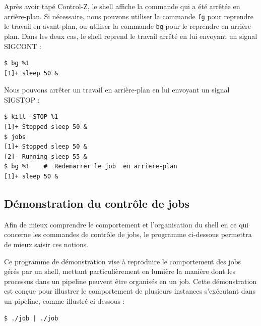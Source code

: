 Après avoir tapé Control-Z, le shell affiche la commande qui a été arrêtée en arrière-plan. Si nécessaire, nous pouvons utiliser la commande \texttt{fg} pour reprendre le travail en avant-plan, ou utiliser la commande \texttt{bg} pour le reprendre en arrière-plan. Dans les deux cas, le shell reprend le travail arrêté en lui envoyant un signal SIGCONT :
\begin{lstlisting}[style=blackstyle]
$ bg %1
[1]+ sleep 50 &  
\end{lstlisting}

Nous pouvons arrêter un travail en arrière-plan en lui envoyant un signal SIGSTOP :

\begin{lstlisting}[style=blackstyle]
$ kill -STOP %1
[1]+ Stopped sleep 50 & 
$ jobs
[1]+ Stopped sleep 50 & 
[2]- Running sleep 55 &
$ bg %1    #  Redemarrer le job  en arriere-plan
[1]+ sleep 50 & 
\end{lstlisting}


\subsection{Démonstration du contrôle de jobs}

Afin de mieux comprendre le comportement et l'organisation du shell en ce qui concerne les commandes de contrôle de jobs, le programme ci-dessous permettra de mieux saisir ces notions.

Ce programme de démonstration vise à reproduire le comportement des jobs gérés par un shell, mettant particulièrement en lumière la manière dont les processus dans un pipeline peuvent être organisés en un job.
Cette démonstration est conçue pour illustrer le comportement de plusieurs instances s'exécutant dans un pipeline, comme illustré ci-dessous :


\begin{lstlisting}[style=blackstyle]
$ ./job | ./job 
\end{lstlisting}

